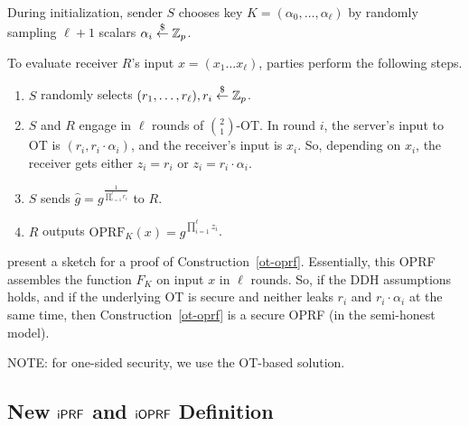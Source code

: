 \begin{construction}
\label{ot-oprf}
  During initialization, sender $S$ chooses key
  $K=(\alpha_0,\ldots,\alpha_\ell)$ by randomly sampling $\ell+1$
  scalars $\alpha_i\stackrel{\$}{\leftarrow}\mathbb{Z}_p$.

  To evaluate receiver $R$'s input $x=(x_1\ldots{}x_\ell)$, parties perform the following steps.
  \begin{enumerate}
  \item $S$ randomly selects $(r_1,\ldots,r_\ell),r_i\stackrel{\$}{\leftarrow}\mathbb{Z}_p$.
  \item $S$ and $R$ engage in $\ell$ rounds of $\binom{2}{1}$-OT. In round
    $i$, the server's input to OT is $(r_i,r_i\cdot\alpha_i)$, and the
    receiver's input is $x_i$. So, depending on $x_i$, the receiver gets either $z_i=r_i$ or $z_i=r_i\cdot{}\alpha_i$.
  \item $S$ sends $\hat{g}=g^{\frac{1}{\prod_{i=1}^{\ell}r_i}}$ to $R$.
    \item $R$ outputs $\text{OPRF}_K(x)=\hat{g}^{\prod^{\ell}_{i=1}z_i}$.
    
    \end{enumerate}
\end{construction}

\citet{oprf} present a sketch for a proof of
Construction~\ref{ot-oprf}. Essentially, this OPRF assembles the
\citeauthor{prf} function $F_K$ on input $x$ in $\ell$ rounds.  So, if
the DDH assumptions holds, and if the underlying OT is secure and
neither leaks $r_i$ and $r_i\cdot\alpha_i$ at the same time, then
Construction~\ref{ot-oprf} is a secure OPRF (in the semi-honest
model).

NOTE: for one-sided security, we use the OT-based solution.

\subsection{New $\mathsf{i}\mathsf{PRF}$ and $\mathsf{i}\mathsf{OPRF}$ Definition}

